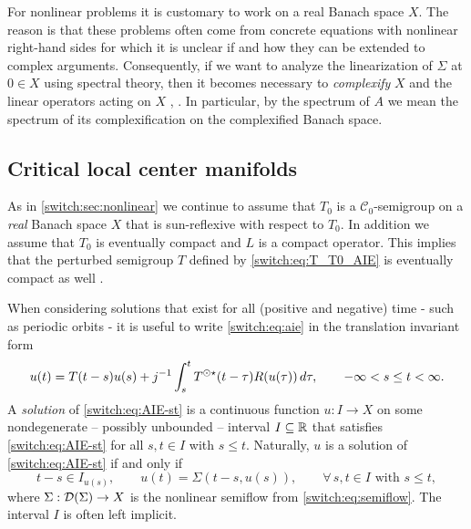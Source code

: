 \begin{remark} \label{switch:rem:complex}
  For nonlinear problems it is customary to work on a real Banach space $X$. The reason is that these problems often come from concrete equations with nonlinear right-hand sides for which it is unclear if and how they can be extended to complex arguments. Consequently, if we want to analyze the linearization of $\Sigma$ at $0 \in X$ using spectral theory, then it becomes necessary to \emph{complexify} $X$ and the linear operators acting on $X$ \textup{\cite[Section III.7 and last part of Section IV.2]{diekmann1995delay}, \cite[Section 1.3]{Ruston1986}}. In particular, by the spectrum of $A$ we mean the spectrum of its complexification on the complexified Banach space.   
\end{remark}

\subsection{Critical local center manifolds}\label{switch:sec:criticalcm}
As in \cref{switch:sec:nonlinear} we continue to assume that $T_0$ is a $\mathcal{C}_0$-semigroup on a \emph{real} Banach space $X$ that is sun-reflexive with respect to $T_0$. In addition we assume that $T_0$ is eventually compact and $L$ is a compact operator. This implies that the perturbed semigroup $T$ defined by \cref{switch:eq:T_T0_AIE} is eventually compact as well \cite[Theorem 2.8]{diekmann2007stability}.

When considering solutions that exist for all (positive and negative) time - such as periodic orbits - it is useful to write \cref{switch:eq:aie} in the translation invariant form
\begin{equation}
  \label{switch:eq:AIE-st}
  u(t) = T(t-s)u(s) + j^{-1} \int_{s}^{t} T^{\odot\star}(t-\tau)R(u(\tau))\,d\tau, \qquad -\infty < s \leq t < \infty.
\end{equation}
A \emph{solution} of \cref{switch:eq:AIE-st} is a continuous function $u : I \to X$ on some nondegenerate -- possibly unbounded -- interval $I \subseteq \mathbb{R}$ that satisfies \cref{switch:eq:AIE-st} for all $s, t \in I$ with $s \le t$. Naturally, $u$ is a solution of \cref{switch:eq:AIE-st} if and only if
\[
  t - s \in I_{u(s)}, \qquad u(t) = \Sigma(t - s, u(s)), \qquad \forall\,s,t \in I \text{ with } s \le t,
\]
where $\Sigma : \mathcal{D}(\Sigma) \to X$ is the nonlinear semiflow from \cref{switch:eq:semiflow}. The interval $I$ is often left implicit.

